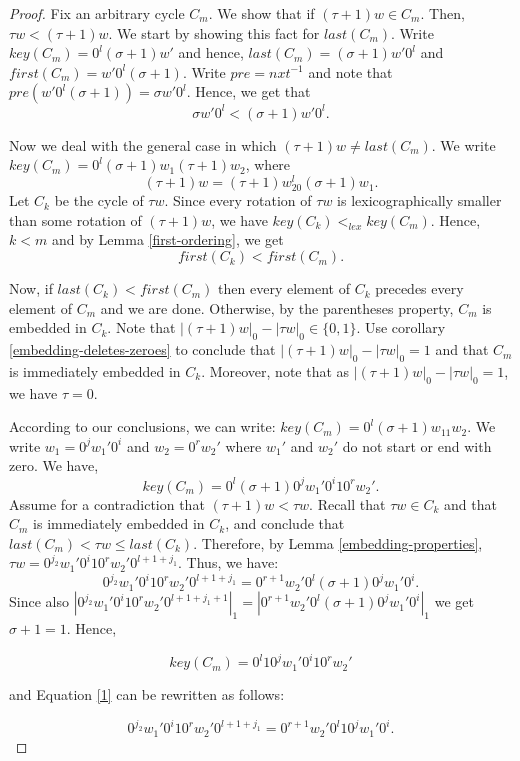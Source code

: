 \documentclass{article}
\theoremstyle{definition}
\begin{document}
\begin{proof}
	Fix an arbitrary cycle $C_m$. We show that if $(\tau+1)w\in C_m$. Then, $\tau w<(\tau+1)w$. We start by showing this fact for $last(C_m)$. Write $key(C_m)=0^l(\sigma+1)w'$ and hence, $last(C_m)=(\sigma+1)w'0^l$ and $first(C_m)=w'0^l(\sigma+1)$. Write $pre=nxt^{-1}$ and note that $pre(w'0^l(\sigma+1))=\sigma w'0^l$. Hence, we get that 
	$$\sigma w' 0^l<(\sigma+1)w'0^l.$$
	
	Now we deal with the general case in which $(\tau+1)w\neq last(C_m)$. We write 
	$key(C_m)=0^l(\sigma+1)w_1(\tau+1)w_2$, where $$(\tau+1)w=(\tau+1)w_20^l(\sigma+1)w_1.$$ Let $C_k$ be the cycle of $\tau w$. Since every rotation of $\tau w$ is lexicographically smaller than some rotation of $(\tau+1)w$, we have $key(C_k)<_{lex}key(C_m)$. Hence, $k<m$ and by Lemma \ref{first-ordering}, we get 
	$$first(C_k)<first(C_m).$$
	
	Now, if $last(C_k)<first(C_m)$ then every element of $C_k$ precedes every element of $C_m$ and we are done. Otherwise, by the parentheses property, $C_m$ is embedded in $C_k$. Note that $|(\tau+1)w|_0-|\tau w|_0\in\{0,1\}$. Use corollary \ref{embedding-deletes-zeroes} to conclude that $|(\tau+1)w|_0-|\tau w|_0=1$ and that $C_m$ is immediately embedded in $C_k$. Moreover, note that as $|(\tau+1)w|_0-|\tau w|_0=1$, we have $\tau=0$.
	
	According to our conclusions, we can write: $key(C_m)=0^l(\sigma+1)w_11w_2$. We write $w_1=0^jw_1'0^i$ and $w_2=0^rw_2'$ where $w_1'$ and $w_2'$ do not start or end with zero. We have,
	$$key(C_m)=0^l(\sigma+1)0^jw_1'0^i10^rw_2'.$$
	Assume for a contradiction that $(\tau+1)w<\tau w$. Recall that $\tau w\in C_k$ and that $C_m$ is immediately embedded in $C_k$, and conclude that $last(C_m)<\tau w\leq last(C_k)$. Therefore, by Lemma \ref{embedding-properties}, $\tau w=0^{j_2}w_1'0^i10^rw_2'0^{l+1+j_1}.$ Thus, we have:
	\begin{equation}
	\label{1}
	0^{j_2}w_1'0^i10^rw_2'0^{l+1+j_1}=0^{r+1}w_2'0^l(\sigma+1)0^jw_1'0^i.
	\end{equation}
	Since also $|0^{j_2}w_1'0^i10^rw_2'0^{l+1+j_1+1}|_1 = |0^{r+1}w_2'0^l(\sigma+1)0^jw_1'0^i|_1$ we get $\sigma+1=1$. Hence,
	
	\begin{equation}
	\label{2}
	key(C_m)=0^l10^jw_1'0^i10^rw_2'
	\end{equation}
	
	and Equation \ref{1} can be rewritten as follows:
	
	\begin{equation}
	\label{3}
	0^{j_2}w_1'0^i10^rw_2'0^{l+1+j_1}=0^{r+1}w_2'0^l10^jw_1'0^i.
	\end{equation}
	

\end{proof}
\end{document}
